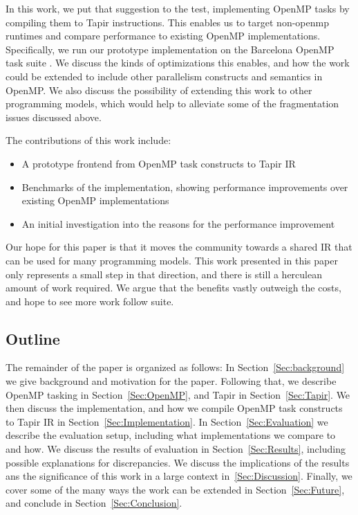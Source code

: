 \documentclass[sigconf]{acmart}
\begin{document}
In this work, we put that suggestion to the test, implementing OpenMP tasks by
compiling them to Tapir instructions. This enables us to target non-openmp
runtimes and compare performance to existing OpenMP implementations. Specifically,
we run our prototype implementation on the Barcelona OpenMP task suite
\cite{barcelona}. We discuss the kinds of optimizations this enables, and how
the work could be extended to include other parallelism constructs and semantics
in OpenMP. We also discuss the possibility of extending this work to other
programming models, which would help to alleviate some of the fragmentation
issues discussed above.

The contributions of this work include: 

\begin{itemize}
\item A prototype frontend from OpenMP task constructs to Tapir IR
\item Benchmarks of the implementation, showing performance improvements over
existing OpenMP implementations
\item An initial investigation into the reasons for the performance improvement
\end{itemize}

Our hope for this paper is that it moves the community towards a shared IR that
can be used for many programming models. This work presented in this paper only
represents a small step in that direction, and there is still a herculean amount
of work required. We argue that the benefits vastly outweigh the costs, and
hope to see more work follow suite. 

\subsection{Outline}

The remainder of the paper is organized as follows: In Section~\ref{Sec:background} 
we give background and motivation for the paper. Following that, we describe OpenMP
tasking in Section~\ref{Sec:OpenMP}, and Tapir in Section~\ref{Sec:Tapir}. We then 
discuss the implementation, and how we compile OpenMP task constructs to Tapir IR in
Section~\ref{Sec:Implementation}. In Section~\ref{Sec:Evaluation} we describe the 
evaluation setup, including what implementations we compare to and how. We discuss
the results of evaluation in Section~\ref{Sec:Results}, including possible
explanations for discrepancies. We discuss the implications of the results ans the
significance of this work in a large context in~\ref{Sec:Discussion}. Finally,
we cover some of the many ways the work can be extended in
Section~\ref{Sec:Future}, and conclude in Section~\ref{Sec:Conclusion}.
\end{document}
